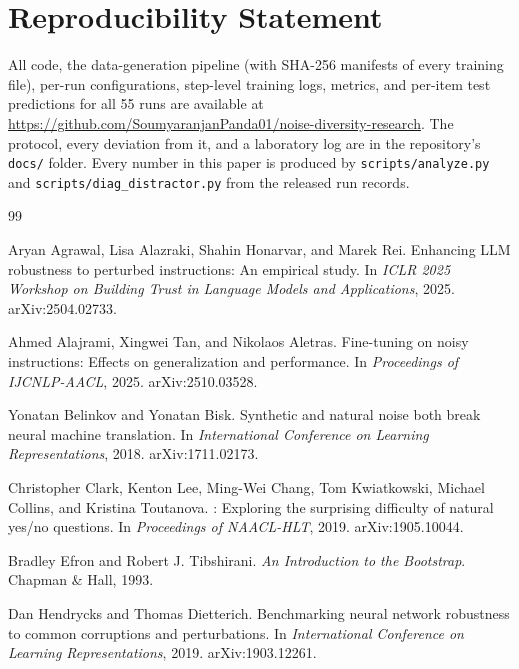\documentclass[11pt]{article}
\begin{document}
\section*{Reproducibility Statement}

All code, the data-generation pipeline (with SHA-256 manifests of every training file), per-run configurations, step-level training logs, metrics, and per-item test predictions for all 55 runs are available at \url{https://github.com/SoumyaranjanPanda01/noise-diversity-research}. The protocol, every deviation from it, and a laboratory log are in the repository's \texttt{docs/} folder. Every number in this paper is produced by \texttt{scripts/analyze.py} and \texttt{scripts/diag\_distractor.py} from the released run records.

\begin{thebibliography}{99}

Aryan Agrawal, Lisa Alazraki, Shahin Honarvar, and Marek Rei.
\newblock Enhancing {LLM} robustness to perturbed instructions: An empirical study.
\newblock In \emph{ICLR 2025 Workshop on Building Trust in Language Models and Applications}, 2025.
\newblock arXiv:2504.02733.

Ahmed Alajrami, Xingwei Tan, and Nikolaos Aletras.
\newblock Fine-tuning on noisy instructions: Effects on generalization and performance.
\newblock In \emph{Proceedings of IJCNLP-AACL}, 2025.
\newblock arXiv:2510.03528.

Yonatan Belinkov and Yonatan Bisk.
\newblock Synthetic and natural noise both break neural machine translation.
\newblock In \emph{International Conference on Learning Representations}, 2018.
\newblock arXiv:1711.02173.

Christopher Clark, Kenton Lee, Ming-Wei Chang, Tom Kwiatkowski, Michael Collins, and Kristina Toutanova.
: Exploring the surprising difficulty of natural yes/no questions.
\newblock In \emph{Proceedings of NAACL-HLT}, 2019.
\newblock arXiv:1905.10044.

Bradley Efron and Robert J. Tibshirani.
\newblock \emph{An Introduction to the Bootstrap}.
\newblock Chapman \& Hall, 1993.

Dan Hendrycks and Thomas Dietterich.
\newblock Benchmarking neural network robustness to common corruptions and perturbations.
\newblock In \emph{International Conference on Learning Representations}, 2019.
\newblock arXiv:1903.12261.


\end{thebibliography}
\end{document}
